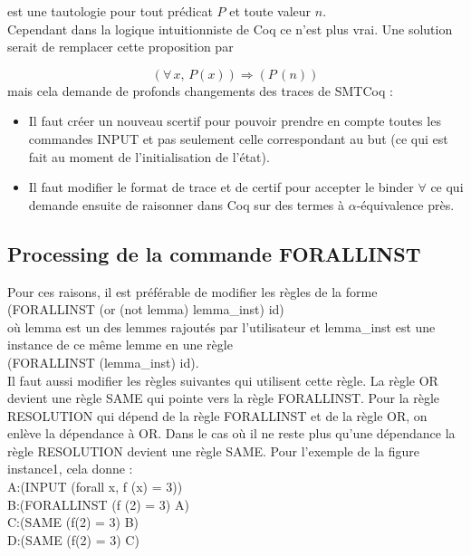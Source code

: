 \documentclass[11pt]{article}
\begin{document}
est une tautologie pour tout prédicat $P$ et toute valeur $n$. \\

Cependant dans la logique intuitionniste de Coq ce n'est plus vrai. Une solution serait de remplacer cette proposition par 

\[   (\forall \, x, \, P(x)) \Rightarrow (P \, (n)) \]
mais cela demande de profonds changements des traces de SMTCoq : 
\begin{itemize}

\item Il faut créer un nouveau scertif pour pouvoir prendre en compte toutes les commandes INPUT et pas seulement celle correspondant au but (ce qui est fait au moment de l'initialisation de l'état).
\item Il faut modifier le format de trace et de certif pour accepter le binder $\forall$ ce qui demande ensuite de raisonner dans Coq sur des termes à $\alpha$-équivalence près.
\end{itemize}


\subsection{Processing de la commande FORALLINST} \label{processing_forallinst}

Pour ces raisons, il est préférable de modifier les règles de la forme \\
     (FORALLINST (or (not lemma) lemma\_inst) id)\\
où lemma est un des lemmes rajoutés par l'utilisateur et lemma\_inst est une instance de ce même lemme en une règle \\

(FORALLINST (lemma\_inst) id).\\

Il faut aussi modifier les règles suivantes qui utilisent cette règle. La règle OR devient une règle SAME qui pointe vers la règle FORALLINST. Pour la règle RESOLUTION qui dépend de la règle FORALLINST et de la règle OR, on enlève la dépendance à OR. Dans le cas où il ne reste plus qu'une dépendance la règle RESOLUTION devient une règle SAME. Pour l'exemple de la figure instance1, cela donne : \\

A:(INPUT (forall x, f (x) = 3)) \\
B:(FORALLINST (f (2) = 3) A) \\
C:(SAME (f(2) = 3) B) \\
D:(SAME (f(2) = 3) C) \\
\end{document}
